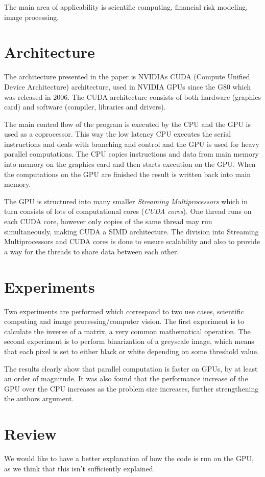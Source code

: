 \documentclass[titlepage, a4paper]{article}
\begin{document}
The main area of applicability is scientific computing, financial risk modeling, image processing.
\section{Architecture}\label{sec:arch}
The architecture presented in the paper is NVIDIAs CUDA (Compute Unified Device Architecture) architecture, used in NVIDIA GPUs since the G80 which was released in 2006. The CUDA architecture consists of both hardware (graphics card) and software (compiler, libraries and drivers).

The main control flow of the program is executed by the CPU and the GPU is used as a coprocessor. This way the low latency CPU executes the serial instructions and deals with branching and control and the GPU is used for heavy parallel computations. The CPU copies instructions and data from main memory into memory on the graphics card and then starts execution on the GPU. When the computations on the GPU are finished the result is written back into main memory.

The GPU is structured into many smaller \textit{Streaming Multiprocessors} which in turn consists of lots of computational cores (\textit{CUDA cores}). One thread runs on each CUDA core, however only copies of the same thread may run simultaneously, making CUDA a SIMD architecture. The division into Streaming Multiprocessors and CUDA cores is done to ensure scalability and also to provide a way for the threads to share data between each other.

\section{Experiments}\label{sec:results}
Two experiments are performed which correspond to two use cases, scientific computing and image processing/computer vision. The first experiment is to calculate the inverse of a matrix, a very common mathematical operation. The second experiment is to perform binarization of a greyscale image, which means that each pixel is set to either black or white depending on some threshold value.

The results clearly show that parallel computation is faster on GPUs, by at least an order of magnitude. It was also found that the performance increase of the GPU over the CPU increases as the problem size increases, further strengthening the authors argument. 

\section{Review}\label{sec:review}
We would like to have a better explanation of how the code is run on the GPU, as we think that this isn't sufficiently explained.
\end{document}
